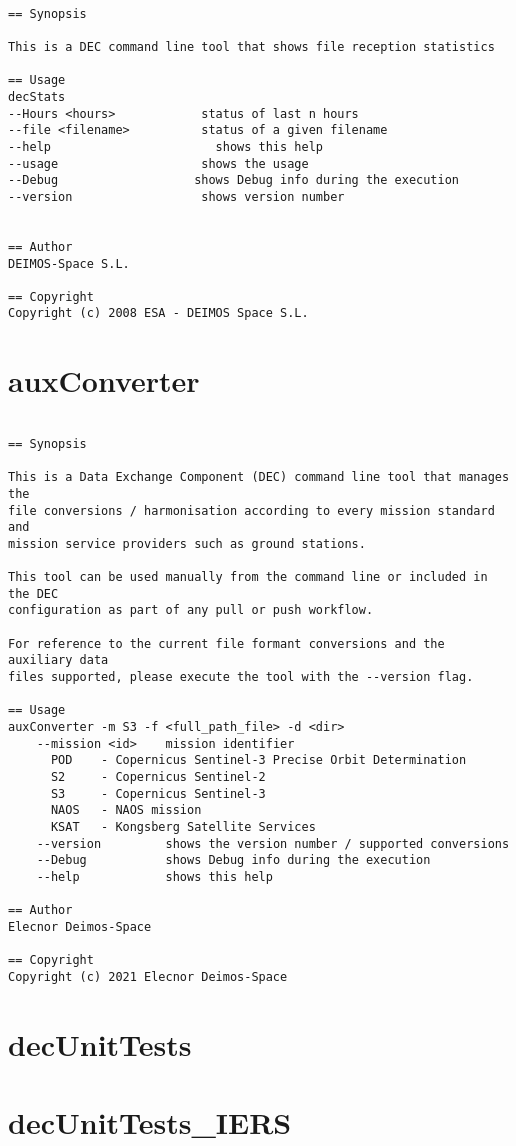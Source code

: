\documentclass[dec_sum_main.tex]{subfiles}
\begin{document}
\begin{verbatim}

== Synopsis

This is a DEC command line tool that shows file reception statistics  

== Usage
decStats
--Hours <hours>            status of last n hours
--file <filename>          status of a given filename
--help                     	 shows this help
--usage                    shows the usage
--Debug                   shows Debug info during the execution
--version                  shows version number


== Author
DEIMOS-Space S.L.

== Copyright
Copyright (c) 2008 ESA - DEIMOS Space S.L.

\end{verbatim}

\label{auxConverter}
\section{auxConverter}

\begin{verbatim}

== Synopsis

This is a Data Exchange Component (DEC) command line tool that manages the
file conversions / harmonisation according to every mission standard and 
mission service providers such as ground stations.

This tool can be used manually from the command line or included in the DEC
configuration as part of any pull or push workflow.

For reference to the current file formant conversions and the auxiliary data
files supported, please execute the tool with the --version flag.

== Usage
auxConverter -m S3 -f <full_path_file> -d <dir>
    --mission <id>    mission identifier
      POD    - Copernicus Sentinel-3 Precise Orbit Determination
      S2     - Copernicus Sentinel-2
      S3     - Copernicus Sentinel-3
      NAOS   - NAOS mission
      KSAT   - Kongsberg Satellite Services
    --version         shows the version number / supported conversions
    --Debug           shows Debug info during the execution
    --help            shows this help

== Author
Elecnor Deimos-Space

== Copyright
Copyright (c) 2021 Elecnor Deimos-Space

\end{verbatim}


\section{decUnitTests}

\section{decUnitTests\_IERS}
\end{document}

